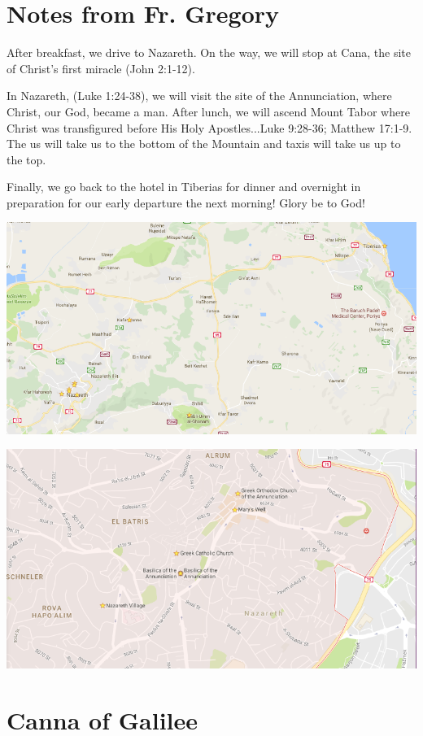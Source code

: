\documentclass[letterpaper]{report}
\begin{document}
\section{Notes from Fr. Gregory}
After breakfast, we drive to Nazareth.
On the way, we will stop at Cana, the site of Christ's first miracle
(John 2:1-12).

In Nazareth, (Luke 1:24-38), we will visit the site of the Annunciation,
where Christ, our God, became a man.
After lunch, we will ascend Mount Tabor where Christ was transfigured before
His Holy Apostles...Luke 9:28-36; Matthew 17:1-9. 
The us will take us to the bottom of the Mountain and taxis will take us up to
the top.

Finally, we go back to the hotel in Tiberias for dinner and overnight in
preparation for our early departure the next morning! Glory be to God!

\includegraphics[width=\textwidth]{TiberiasCanaNazarethTabor}

\includegraphics[width=\textwidth]{Nazareth}


\clearpage
\section{Canna of Galilee}
\begin{multicols}{2}
	\mbox{}
\end{multicols}
\end{document}
